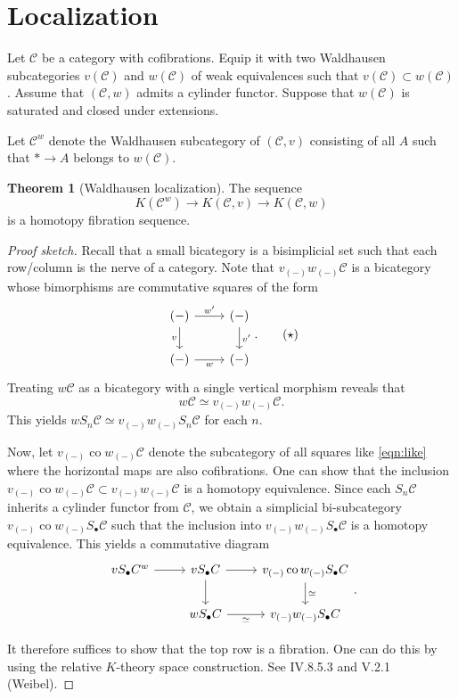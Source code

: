 \documentclass[10pt,letterpaper,cm]{nupset}
\theoremstyle{definition}
\theoremstyle{theorem}
\newtheorem{theorem}[definition]{Theorem}
\theoremstyle{remark}
\newcommand{\1}{\mathbf{1}}
\renewcommand{\c}{\mathscr{C}}
\newcommand{\0}{\vec 0}
\DeclareMathOperator{\co}{co}
\begin{document}
\section{Localization}

Let $\c$ be a category with cofibrations. Equip it with two Waldhausen subcategories $v(\c)$ and $w(\c)$ of weak equivalences such that $v(\c) \subset w(\c)$. Assume that $\left(\c, w\right)$ admits a cylinder functor. Suppose that $w(\c)$ is saturated and closed under extensions. 

\smallskip


Let $\c^w$ denote the Waldhausen subcategory of $(\c, v)$ consisting of all $A$ such that $\ast \to A$ belongs to $w(\c)$.

\begin{theorem}[Waldhausen localization]\label{local}
The sequence $$ K(\c^w) \to K(\c, v) \to K(\c, w) $$ is a homotopy fibration sequence.
\end{theorem}
\begin{proof}[Proof sketch]
Recall that a small bicategory is a bisimplicial set such that each row/column is the nerve of a category. Note that $v_{(-)}w_{(-)}\c$ is a bicategory whose bimorphisms are commutative squares of the form
\[ \label{eqn:like}
\begin{tikzcd}
(-) \arrow[r, "w'"] \arrow[d, "v"'] & (-) \arrow[d, "v'"] \\
(-) \arrow[r, "w"'] & (-)
\end{tikzcd}. \tag{$\star$}
\]
Treating $w \c$ as a bicategory with a single vertical morphism reveals that $$w \c \simeq v_{(-)}w_{(-)}\c.$$This yields  $wS_n \c \simeq v_{(-)}w_{(-)}S_n\c$ for each $n$.

\medskip

 Now, let $v_{(-)}\co w_{(-)}\c$ denote the subcategory of all squares like \eqref{eqn:like} where the horizontal maps are also cofibrations. One can show that the inclusion $v_{(-)}\co w_{(-)}\c \subset v_{(-)}w_{(-)}\c$ is a homotopy equivalence. Since each $S_n \c$ inherits a cylinder functor from $\c$, we obtain a simplicial bi-subcategory $v_{(-)}\co w_{(-)}S_{\bullet}\c$ such that the inclusion into $v_{(-)}w_{(-)}S_{\bullet}\c$ is a homotopy equivalence. This yields a commutative diagram
\[
\begin{tikzcd}
vS_{\bullet}C^w \arrow[r] & vS_{\bullet}C \arrow[r] \arrow[d] & v_{(-)}\co w_{(-)}S_{\bullet}C \arrow[d, "\simeq"] \\
 & wS_{\bullet}C \arrow[r, "\simeq"'] & v_{(-)}w_{(-)}S_{\bullet}C
\end{tikzcd}.
\]

\medskip

 It therefore suffices to show that the top row is a fibration. One can do this by using the relative $K$-theory space construction. See IV.8.5.3 and V.2.1 (Weibel).
\end{proof}
\end{document}
